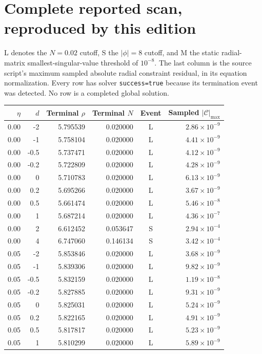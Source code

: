 \documentclass[11pt,oneside]{report}
\begin{document}
\section{Complete reported scan, reproduced by this edition}
L denotes the $N=0.02$ cutoff, S the $|\phi|=8$ cutoff, and M the static radial-matrix smallest-singular-value threshold of $10^{-8}$. The last column is the source script's maximum sampled absolute radial constraint residual, in its equation normalization. Every row has solver \texttt{success=true} because its termination event was detected. No row is a completed global solution.
\begin{longtable}{rrrrcr}
\toprule $\eta$ & $d$ & Terminal $\rho$ & Terminal $N$ & Event & Sampled $|\mathcal C|_{\max}$\\\midrule\endhead
0.00 & -2 & 5.795539 & 0.020000 & L & $2.86\times10^{-9}$\\
0.00 & -1 & 5.758104 & 0.020000 & L & $4.41\times10^{-9}$\\
0.00 & -0.5 & 5.737471 & 0.020000 & L & $4.12\times10^{-9}$\\
0.00 & -0.2 & 5.722809 & 0.020000 & L & $4.28\times10^{-9}$\\
0.00 & 0 & 5.710783 & 0.020000 & L & $6.13\times10^{-9}$\\
0.00 & 0.2 & 5.695266 & 0.020000 & L & $3.67\times10^{-9}$\\
0.00 & 0.5 & 5.661474 & 0.020000 & L & $5.46\times10^{-8}$\\
0.00 & 1 & 5.687214 & 0.020000 & L & $4.36\times10^{-7}$\\
0.00 & 2 & 6.612452 & 0.053647 & S & $2.94\times10^{-4}$\\
0.00 & 4 & 6.747060 & 0.146134 & S & $3.42\times10^{-4}$\\
0.05 & -2 & 5.853846 & 0.020000 & L & $3.68\times10^{-9}$\\
0.05 & -1 & 5.839306 & 0.020000 & L & $9.82\times10^{-9}$\\
0.05 & -0.5 & 5.832159 & 0.020000 & L & $1.19\times10^{-8}$\\
0.05 & -0.2 & 5.827885 & 0.020000 & L & $9.31\times10^{-9}$\\
0.05 & 0 & 5.825031 & 0.020000 & L & $5.24\times10^{-9}$\\
0.05 & 0.2 & 5.822165 & 0.020000 & L & $4.91\times10^{-9}$\\
0.05 & 0.5 & 5.817817 & 0.020000 & L & $5.23\times10^{-9}$\\
0.05 & 1 & 5.810299 & 0.020000 & L & $5.89\times10^{-9}$\\

\end{longtable}
\end{document}
